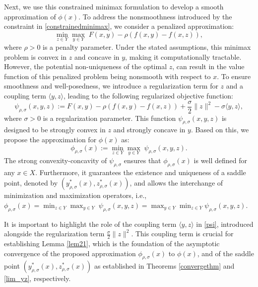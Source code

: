 \documentclass{article}
\begin{document}
Next, we use this constrained minimax formulation to develop a smooth approximation of $\phi(x)$. To address the nonsmoothness introduced by the constraint in \eqref{constrainedminimax}, we consider a penalized approximation:
\[
\min_{ z\in {Y}} \max_{y\in {Y}}\;F(x, y)-\rho(f(x, y)-f( x, z)),
\]
where $\rho >0$ is a penalty parameter. Under the stated assumptions, this minimax problem is convex in $z$ and concave in $y$, making it computationally tractable. However, the potential non-uniqueness of the optimal $z$, can result in the value function of this penalized problem being nonsmooth with respect to $x$. To ensure smoothness and well-posedness, we introduce a regularization term for $z$ and a coupling term $\langle y, z\rangle$, leading to the following regularized objective function:
\begin{equation}\label{psi}
\psi_{\rho,\sigma}(x,y,z):=F(x,y)-\rho(f(x,y)-f(x,z))+\frac{\sigma}{2}\|z\|^2-\sigma\langle y, z\rangle,
\end{equation}
where $\sigma>0$ is a regularization parameter. This function $\psi_{\rho,\sigma}(x,y,z)$ is designed to be strongly convex in $z$ and strongly concave in $y$. Based on this, we propose the approximation for $\phi(x)$ as:
\begin{equation}\label{phi}
  \phi_{\rho,\sigma}(x):=\min_{z\in {Y}} \max_{ y \in {Y}}\; \psi_{\rho,\sigma}(x, y, z).
\end{equation}
The strong convexity-concavity of $\psi_{\rho,\sigma}$ ensures that $\phi_{\rho,\sigma}(x)$ is well defined for any $x \in X$. Furthermore, it guarantees the existence and uniqueness of a saddle point, denoted by $(y_{\rho,\sigma}^*(x),z_{\rho,\sigma}^*(x))$, and allows the interchange of minimization and maximization operators, i.e., $\phi_{\rho,\sigma}(x)=\min_{z\in {Y}} \max_{ y \in {Y}}\; \psi_{\rho,\sigma}(x, y, z) = \max_{ y \in {Y}}\min_{z\in {Y}} \psi_{\rho,\sigma}(x, y, z)$. 

It is important to highlight the role of the coupling term $\langle y,z\rangle$ in \eqref{psi}, introduced alongside the regularization term $\frac{\sigma}{2}\|z\|^2$. This coupling term is crucial for establishing Lemma \ref{lem21}, which is the foundation of the asymptotic convergence of the proposed approximation $\phi_{\rho,\sigma}(x)$ to $\phi(x)$, and of the saddle point $(y_{\rho,\sigma}^*(x),z_{\rho,\sigma}^*(x))$  as established in Theorems \ref{convergethm} and \ref{lim_yz}, respectively.
\end{document}
